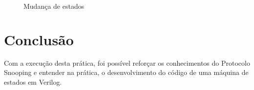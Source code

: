 \documentclass[12pt, a4paper]{article}
\begin{document}
	\begin{figure}[H]
		\centering
		\caption{Mudança de estados}
		\label{listening}
	\end{figure}
	

	\section{Conclusão}
	
	\par Com a execução desta prática, foi possível reforçar os conhecimentos do Protocolo Snooping e entender na prática, o desenvolvimento do código de uma máquina de estados em Verilog.
\end{document}
